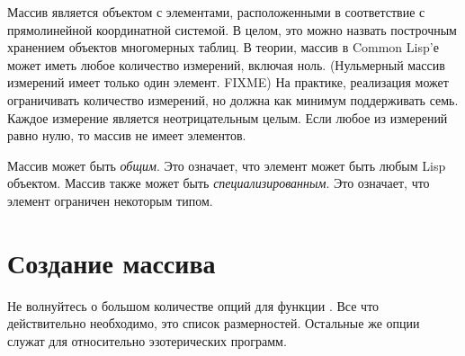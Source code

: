 Массив является объектом с элементами, расположенными в соответствие с
прямолинейной координатной системой. В целом, это можно назвать построчным
хранением объектов многомерных таблиц.
В теории, массив в Common Lisp'е может иметь любое количество измерений, включая
ноль.
(Нульмерный массив измерений имеет только один элемент. FIXME)
На практике, реализация может ограничивать количество измерений,
но должна как минимум поддерживать семь.
Каждое измерение является неотрицательным целым. Если любое из измерений равно
нулю, то массив не имеет элементов.

Массив может быть \emph{общим}. Это означает, что элемент может быть
любым Lisp объектом. Массив также может быть \emph{специализированным}. Это
означает, что элемент ограничен некоторым типом.

\section{Создание массива}

Не волнуйтесь о большом количестве опций для функции .
Все что действительно необходимо, это список размерностей. Остальные же опции
служат для относительно эзотерических программ.

